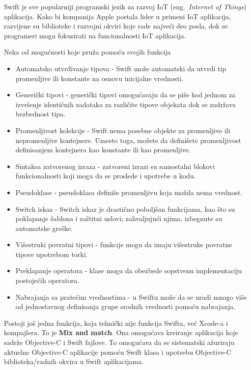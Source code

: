 \documentclass[a4paper]{article}
\begin{document}
Swift je sve popularniji programski jezik za razvoj IoT (eng.~{\em Internet of Things}) aplikacija. Kako bi kompanija Apple postala lider u primeni IoT aplikacija, razvijene su biblioteke i razvojni okviri koje rade najveći deo posla, dok se programeri mogu fokusirati na funcionalnosti IoT aplikacija.

Neka od mogućnosti koje pruža pomoću svojih funkcija \cite{mastering_swift3}
\begin{itemize}
\item Automatsko utvrđivanje tipova - Swift može automatski da utvrdi tip promenljive ili konstante na osnovu inicijalne
vrednosti. 
\item Generički tipovi - generički tipovi omogućavaju da se piše kod jednom za izvršenje identičnih
zadataka za različite tipove objekata dok se zadržava bezbednost tipa. 
\item Promenljivost kolekcije - Swift nema posebne objekte za promenljive ili nepromenljive kontejnere. Umesto
toga, možete da definišete promenljivost definisanjem kontejnera kao konstante
ili kao promenljive.
\item Sintaksa zatvorenog izraza - zatvoreni izrazi su samostalni blokovi funkcionalnosti koji mogu da se proslede i upotrebe u kodu.
\item Pseudoklase - pseudoklasa definiše promenljivu koja možda nema vrednost.
\item Switch iskaz - Switch iskaz je drastično poboljšan funkcijama, kao što su poklapanje šablona i
zaštitni uslovi; zahvaljujući njima, izbegnute su automatske greške.
\item Višestruki povratni tipovi - funkcije mogu da imaju višestruke povratne tipove upotrebom torki. 
\item Preklapanje operatora - klase mogu da obezbede sopstvenu implementaciju postojećih operatora. 
\item Nabrajanja sa pratećim vrednostima - u Swiftu može da se uradi mnogo više od jednostavnog definisanja grupe srodnih vrednosti pomoću nabrajanja.
\end{itemize}

Postoji još jedna funkcija, koja tehnički nije
funkcija Swifta, već Xcode-a i kompajlera. To je \textbf{Mix and match}. Ona omogućava kreiranje aplikacija koje sadrže Objective-C i Swift fajlove. To omogućava da se sistematski ažuriraju aktuelne Objective-C aplikacije pomoću Swift klasa i upotrebu Objective-C biblioteka/radnih okvira u Swift aplikacijama.
\end{document}
